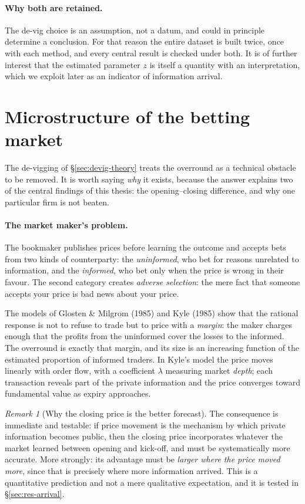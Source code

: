 \documentclass[12pt,a4paper,oneside]{report}
\renewcommand{\_}{\oldunderscore\allowbreak}
\theoremstyle{definition}
\theoremstyle{plain}
\theoremstyle{remark}
\newtheorem{remark}[theorem]{Remark}
\begin{document}
\paragraph{Why both are retained.} The de-vig choice is an assumption, not a datum, and could
in principle determine a conclusion. For that reason the entire dataset is built twice, once
with each method, and every central result is checked under both. It is of further interest
that the estimated parameter $z$ is itself a quantity with an interpretation, which we exploit
later as an indicator of information arrival.

\section{Microstructure of the betting market}
\label{sec:microstructure-theory}

The de-vigging of \S\ref{sec:devig-theory} treats the overround as a technical obstacle to be
removed. It is worth saying \emph{why} it exists, because the answer explains two of the
central findings of this thesis: the opening--closing difference, and why one particular firm
is not beaten.

\paragraph{The market maker's problem.} The bookmaker publishes prices before learning the
outcome and accepts bets from two kinds of counterparty: the \emph{uninformed}, who bet for
reasons unrelated to information, and the \emph{informed}, who bet only when the price is wrong
in their favour. The second category creates \emph{adverse selection}: the mere fact that
someone accepts your price is bad news about your price.

The models of Glosten \& Milgrom (1985) and Kyle (1985) show that the rational response is not
to refuse to trade but to price with a \emph{margin}: the maker charges enough that the profits
from the uninformed cover the losses to the informed. The overround is exactly that margin, and
its size is an increasing function of the estimated proportion of informed traders. In Kyle's
model the price moves linearly with order flow, with a coefficient $\lambda$ measuring market
\emph{depth}; each transaction reveals part of the private information and the price converges
toward fundamental value as expiry approaches.

\begin{remark}[Why the closing price is the better forecast]
\label{rem:closing}
The consequence is immediate and testable: if price movement is the mechanism by which private
information becomes public, then the closing price incorporates whatever the market learned
between opening and kick-off, and must be systematically more accurate. More strongly: its
advantage must be \emph{larger where the price moved more}, since that is precisely where more
information arrived. This is a quantitative prediction and not a mere qualitative expectation,
and it is tested in \S\ref{sec:res-arrival}.
\end{remark}
\end{document}
